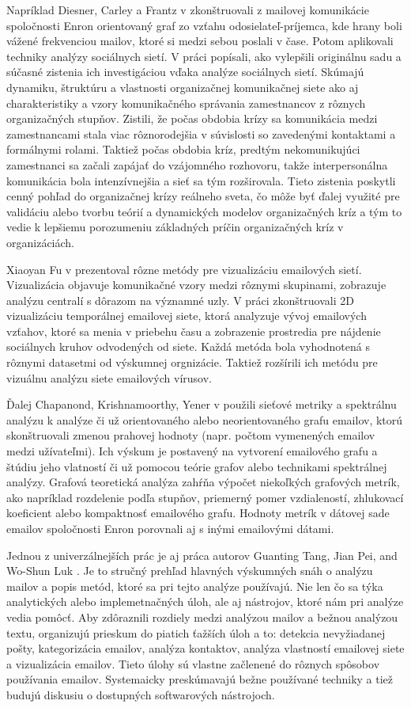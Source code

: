 \documentclass[slovak,master,public,dept460,male,cpdeclaration,oneside]{diploma}
\begin{document}
Napríklad Diesner, Carley a Frantz v \cite{3} zkonštruovali z mailovej komunikácie spoločnosti Enron orientovaný graf zo vzťahu odosielateľ-príjemca, kde hrany boli vážené frekvenciou mailov, ktoré si medzi sebou poslali v čase. Potom aplikovali techniky analýzy sociálnych sietí. V práci popísali, ako vylepšili originálnu sadu a súčasné zistenia ich investigáciou vďaka analýze sociálnych sietí. Skúmajú dynamiku, štruktúru a vlastnosti organizačnej komunikačnej siete ako aj charakteristiky a vzory komunikačného správania zamestnancov z rôznych organizačných stupňov. Zistili, že počas obdobia krízy sa komunikácia medzi zamestnancami stala viac rôznorodejšia v súvislosti so zavedenými kontaktami a formálnymi rolami. Taktiež počas obdobia kríz, predtým nekomunikujúci zamestnanci sa začali zapájať do vzájomného rozhovoru, takže interpersonálna komunikácia bola intenzívnejšia a sieť sa tým rozširovala. Tieto zistenia poskytli cenný pohľad do organizačnej krízy reálneho sveta, čo môže byť ďalej využité pre validáciu alebo tvorbu teórií a dynamických modelov organizačných kríz a tým to vedie k lepšiemu porozumeniu základných príčin organizačných kríz v organizáciách.


Xiaoyan Fu v \cite{2} prezentoval rôzne metódy pre vizualizáciu emailových sietí. Vizualizácia objavuje komunikačné vzory medzi rôznymi skupinami, zobrazuje analýzu centralí s dôrazom na významné uzly.
V práci zkonštruovali 2D vizualizáciu temporálnej emailovej siete, ktorá analyzuje vývoj emailových vzťahov, ktoré sa menia v priebehu času a zobrazenie prostredia pre nájdenie sociálnych kruhov odvodených od siete. Každá metóda bola vyhodnotená s rôznymi datasetmi od výskumnej orgnizácie. Taktiež rozšírili ich metódu pre vizuálnu analýzu siete emailových vírusov.

Ďalej Chapanond, Krishnamoorthy, Yener v \cite{4} použili sieťové metriky a spektrálnu analýzu k analýze či už orientovaného alebo neorientovaného grafu emailov, ktorú skonštruovali zmenou prahovej hodnoty (napr. počtom vymenených emailov medzi užívateľmi). Ich výskum je postavený na vytvorení emailového grafu a štúdiu jeho vlatností či už pomocou teórie grafov alebo technikami spektrálnej analýzy. Grafová teoretická analýza zahŕňa výpočet niekoľkých grafových metrík, ako napríklad rozdelenie podľa stupňov, priemerný pomer vzdialeností, zhlukovací koeficient alebo kompaktnosť emailového grafu. Hodnoty metrík v dátovej sade emailov spoločnosti Enron porovnali aj s inými emailovými dátami. 

Jednou z univerzálnejších prác je aj práca autorov Guanting Tang, Jian Pei, and Wo-Shun Luk \cite{1}. Je to stručný prehľad hlavných výskumných snáh o analýzu mailov a popis metód, ktoré sa pri tejto analýze používajú. Nie len čo sa týka analytických alebo implemetnačných úloh, ale aj nástrojov, ktoré nám pri analýze vedia pomôcť. Aby zdôraznili rozdiely medzi analýzou mailov a bežnou analýzou textu, organizujú prieskum do piatich ťažších úloh a to:  detekcia nevyžiadanej pošty, kategorizácia emailov, analýza kontaktov, analýza vlastností emailovej siete a vizualizácia emailov. Tieto úlohy sú vlastne začlenené do rôznych spôsobov používania emailov. Systemaicky preskúmavajú bežne používané techniky a tiež budujú diskusiu o dostupných softwarových nástrojoch.
\end{document}
